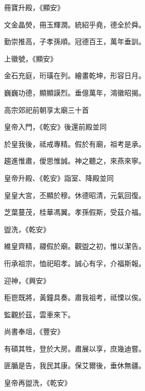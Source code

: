 \begin{pinyinscope}
 冊寶升殿，《顯安》



 文金晶熒，冊玉輝潤。統紹乎堯，德全於舜。



 勤崇推高，子孝孫順。冠德百王，萬年垂訓。



 上徽號，《顯安》



 金石充庭，珩璜在列。繪畫乾坤，形容日月。



 巍巍功德，顯顯謨烈。垂億萬年，鴻徽昭揭。



 高宗郊祀前朝享太廟三十首



 皇帝入門，《乾安》後還前殿並同



 於皇我後，祗戒專精。假於有廟，祖考是承。



 趨進惟肅，僾思惟誠。神之聽之，來燕來寧。



 皇帝升殿、《乾安》詣室、降殿並同



 皇皇大宮，丕顯於穆。休德昭清，元氣回復。



 芝葉蔓茂，桂華馮翼。孝孫假斯，受茲介福。



 盥洗，《乾安》



 維皇齊精，鬷假於廟。觀盥之初，惟以潔告。



 衎承祖宗，恤祀昭孝。誠心有孚，介福斯報。



 迎神，《興安》



 秬鬯既將，黃鐘具奏。肅我祖考，祗慄以俟。



 監觀於茲，雲車來下。



 尚書奉俎，《豐安》



 有碩其牲，登於大房。肅展以享，庶幾迪嘗。



 匪腯是告，我民其康。保艾爾後，垂休無疆。



 皇帝再盥洗，《乾安》




\end{pinyinscope}
